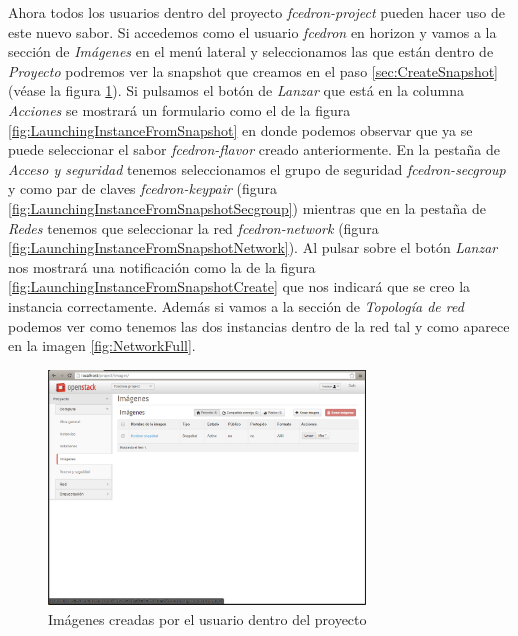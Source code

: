 \documentclass{article}
\begin{document}
	Ahora todos los usuarios dentro del proyecto \emph{fcedron-project} pueden hacer uso de este nuevo sabor. Si accedemos como el usuario \emph{fcedron} en horizon y vamos a la sección de \emph{Imágenes} en el menú lateral y seleccionamos las que están dentro de \emph{Proyecto} podremos ver la snapshot que creamos en el paso \ref{sec:CreateSnapshot} (véase la figura \ref{fig:UserSnapshot}). Si pulsamos el botón de \emph{Lanzar} que está en la columna \emph{Acciones} se mostrará un formulario como el de la figura \ref{fig:LaunchingInstanceFromSnapshot} en donde podemos observar que ya se puede seleccionar el sabor \emph{fcedron-flavor} creado anteriormente. En la pestaña de \emph{Acceso y seguridad} tenemos seleccionamos el grupo de seguridad \emph{fcedron-secgroup} y como par de  claves \emph{fcedron-keypair} (figura \ref{fig:LaunchingInstanceFromSnapshotSecgroup}) mientras que en la pestaña de \emph{Redes} tenemos que seleccionar la red \emph{fcedron-network} (figura \ref{fig:LaunchingInstanceFromSnapshotNetwork}). Al pulsar sobre el botón \emph{Lanzar} nos mostrará una notificación como la de la figura \ref{fig:LaunchingInstanceFromSnapshotCreate} que nos indicará que se creo la instancia correctamente. Además si vamos a la sección de \emph{Topología de red} podemos ver como tenemos las dos instancias dentro de la red tal y como aparece en la imagen \ref{fig:NetworkFull}.

\begin{figure}[h]
  \centering
    \includegraphics[width=0.75\textwidth]{img/m_068.png}
  \caption{Imágenes creadas por el usuario dentro del proyecto}
  \label{fig:UserSnapshot}
\end{figure}	
\end{document}
